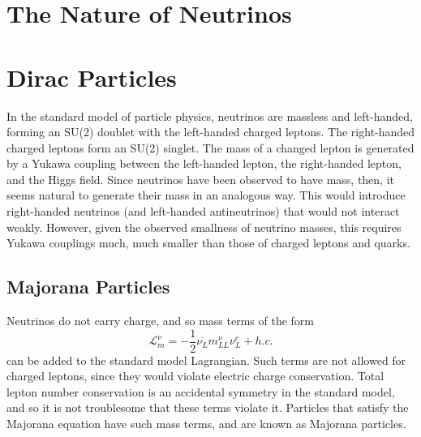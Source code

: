 \documentclass[herrin-thesis.tex]{subfiles}
\begin{document}
\section{The Nature of Neutrinos}
\section{Dirac Particles}
In the standard model of particle physics, neutrinos are massless and left-handed, forming an SU(2) doublet with the left-handed charged leptons. The right-handed charged leptons form an SU(2) singlet. The mass of a changed lepton is generated by a Yukawa coupling between the left-handed lepton, the right-handed lepton, and the Higgs field. Since neutrinos have been observed to have mass, then, it seems natural to generate their mass in an analogous way. This would introduce right-handed neutrinos (and left-handed antineutrinos) that would not interact weakly. However, given the observed smallness of neutrino masses, this requires Yukawa couplings much, much smaller than those of charged leptons and quarks.

\subsection{Majorana Particles}
Neutrinos do not carry charge, and so mass terms of the form
\begin{equation}
\mathcal{L}_{m}^{\nu} = -\frac{1}{2}\overline{\nu_{L}} m_{L L}^{\nu} \nu_{L}^{c} +h.c.
\label{eq:nu_majorana_lagrangian}
\end{equation}
can be added to the standard model Lagrangian. Such terms are not allowed for charged leptons, since they would violate electric charge conservation. Total lepton number conservation is an accidental symmetry in the standard model, and so it is not troublesome that these terms violate it. Particles that satisfy the Majorana equation have such mass terms, and are known as Majorana particles.
\end{document}
